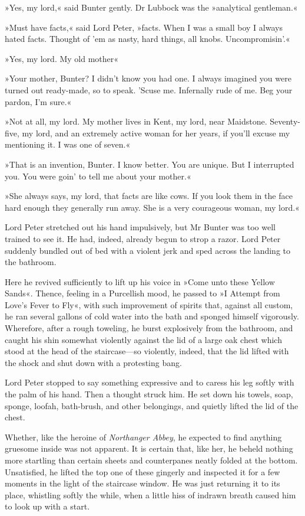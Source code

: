 »Yes, my lord,« said Bunter gently. Dr Lubbock was the »analytical gentleman.«

»Must have facts,« said Lord Peter, »facts. When I was a small boy I always hated facts. Thought of 'em as nasty, hard things, all knobs.  Uncompromisin'.«

»Yes, my lord. My old mother\longdash«

»Your mother, Bunter? I didn't know you had one. I always imagined you were turned out ready-made, so to speak. 'Scuse me. Infernally rude of me. Beg your pardon, I'm sure.«

»Not at all, my lord. My mother lives in Kent, my lord, near Maidstone.  Seventy-five, my lord, and an extremely active woman for her years, if you'll excuse my mentioning it. I was one of seven.«

»That is an invention, Bunter. I know better. You are unique. But I interrupted you. You were goin' to tell me about your mother.«

»She always says, my lord, that facts are like cows. If you look them in the face hard enough they generally run away. She is a very courageous woman, my lord.«

Lord Peter stretched out his hand impulsively, but Mr Bunter was too well trained to see it. He had, indeed, already begun to strop a razor.  Lord Peter suddenly bundled out of bed with a violent jerk and sped
across the landing to the bathroom.

Here he revived sufficiently to lift up his voice in »Come unto these Yellow Sands«. Thence, feeling in a Purcellish mood, he passed to »I Attempt from Love's Fever to Fly«, with such improvement of spirits that, against all custom, he ran several gallons of cold water into the bath and sponged himself vigorously. Wherefore, after a rough toweling, he burst explosively from the bathroom, and caught his shin somewhat violently against the lid of a large oak chest which stood at the head of the staircase—so violently, indeed, that the lid lifted with the shock and shut down with a protesting bang.

Lord Peter stopped to say something expressive and to caress his leg softly with the palm of his hand. Then a thought struck him. He set down his towels, soap, sponge, loofah, bath-brush, and other belongings, and quietly lifted the lid of the chest.

Whether, like the heroine of \textit{Northanger Abbey}, he expected to find anything gruesome inside was not apparent. It is certain that, like her, he beheld nothing more startling than certain sheets and counterpanes neatly folded at the bottom. Unsatisfied, he lifted the top one of these gingerly and inspected it for a few moments in the light of the staircase window. He was just returning it to its place, whistling softly the while, when a little hiss of indrawn breath caused him to look up with a start.

